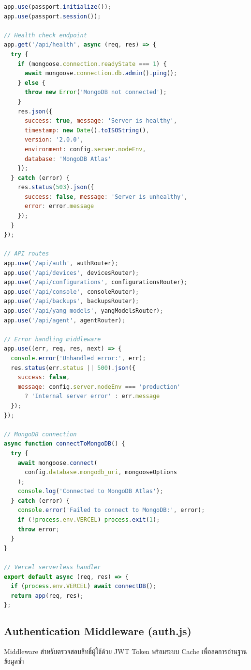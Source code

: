 \begin{lstlisting}[language=JavaScript, caption={server.js -- Express Server Setup}]
app.use(passport.initialize());
app.use(passport.session());

// Health check endpoint
app.get('/api/health', async (req, res) => {
  try {
    if (mongoose.connection.readyState === 1) {
      await mongoose.connection.db.admin().ping();
    } else {
      throw new Error('MongoDB not connected');
    }
    res.json({
      success: true, message: 'Server is healthy',
      timestamp: new Date().toISOString(),
      version: '2.0.0',
      environment: config.server.nodeEnv,
      database: 'MongoDB Atlas'
    });
  } catch (error) {
    res.status(503).json({
      success: false, message: 'Server is unhealthy',
      error: error.message
    });
  }
});

// API routes
app.use('/api/auth', authRouter);
app.use('/api/devices', devicesRouter);
app.use('/api/configurations', configurationsRouter);
app.use('/api/console', consoleRouter);
app.use('/api/backups', backupsRouter);
app.use('/api/yang-models', yangModelsRouter);
app.use('/api/agent', agentRouter);

// Error handling middleware
app.use((err, req, res, next) => {
  console.error('Unhandled error:', err);
  res.status(err.status || 500).json({
    success: false,
    message: config.server.nodeEnv === 'production'
      ? 'Internal server error' : err.message
  });
});

// MongoDB connection
async function connectToMongoDB() {
  try {
    await mongoose.connect(
      config.database.mongodb_uri, mongooseOptions
    );
    console.log('Connected to MongoDB Atlas');
  } catch (error) {
    console.error('Failed to connect to MongoDB:', error);
    if (!process.env.VERCEL) process.exit(1);
    throw error;
  }
}

// Vercel serverless handler
export default async (req, res) => {
  if (process.env.VERCEL) await connectDB();
  return app(req, res);
};
\end{lstlisting}

\subsection{Authentication Middleware (auth.js)}
\hspace*{1.3em}
Middleware สำหรับตรวจสอบสิทธิ์ผู้ใช้ด้วย JWT Token พร้อมระบบ Cache เพื่อลดการอ่านฐานข้อมูลซ้ำ

